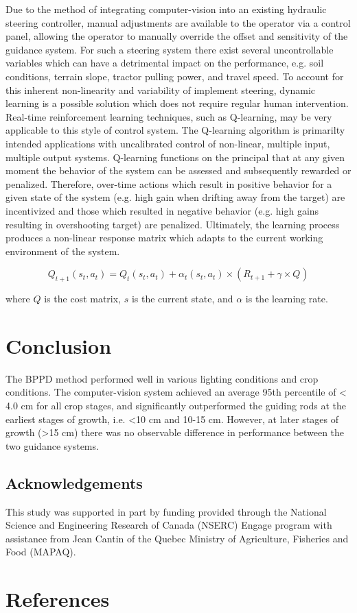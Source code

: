 \documentclass[authoryear]{elsarticle}
\begin{document}
Due to the method of integrating computer-vision into an existing
hydraulic steering controller, manual adjustments are available to the
operator via a control panel, allowing the operator to manually override the
offset and sensitivity of the guidance system. For such a
steering system there exist several uncontrollable variables which can
have a detrimental impact on the performance, e.g. soil conditions,
terrain slope, tractor pulling power, and travel speed. To account for
this inherent non-linearity and variability of implement steering,
dynamic learning is a possible solution which does not require regular human
intervention. Real-time reinforcement learning techniques, such as
Q-learning, may be very applicable to this style of control
system. The Q-learning algorithm is primarilty intended applications
with uncalibrated control of non-linear, multiple input, multiple output systems. 
Q-learning functions on the principal that at any given
moment the behavior of the system can be assessed and subsequently
rewarded or penalized. Therefore, over-time actions which result
in positive behavior for a given state of the system (e.g. high gain
when drifting away from the target) are incentivized and those which
resulted in negative behavior (e.g. high gains resulting in
overshooting target) are penalized. Ultimately, the learning process
produces a non-linear response matrix which adapts to the current
working environment of the system.

\begin{equation}
  Q_{t+1}(s_t,a_t) = Q_{t}(s_t,a_t) + \alpha_{t}(s_t,a_t) \times
  \left( R_{t+1} + \gamma \times Q_{} \right)
  \label{eq:qlearning}
\end{equation}
\begin{flushleft}
where $Q$ is the cost matrix, $s$ is the current state, and $\alpha$
is the learning rate. 
\end{flushleft}

\section{Conclusion}
The BPPD method performed well in various lighting conditions and crop conditions.
The computer-vision system achieved an average 95th percentile of <
4.0 cm for all crop stages, and significantly outperformed the guiding
rods at the earliest stages of growth, i.e. <10 cm and 10-15 cm. However, at
later stages of growth (>15 cm) there was no observable difference in
performance between the two guidance systems. 

\subsection{Acknowledgements}
This study was supported in part by funding provided through the
National Science and Engineering Research of Canada (NSERC) Engage
program with assistance from Jean Cantin of the Quebec Ministry of
Agriculture, Fisheries and Food (MAPAQ).

\section{References}

\end{document}
